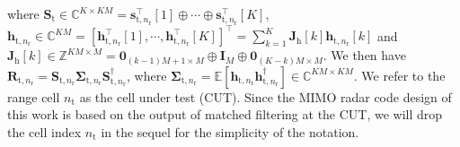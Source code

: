 \documentclass[10pt,journal]{IEEEtran}
\newcommand{\paren}[1]{\left({#1}\right)}
\newcommand{\bracket}[1]{{\left [{#1}\right ]}}
\newcommand{\rr}{_\mathrm{r}}
\newcommand{\target}{\mathrm{t}}
\theoremstyle{definition}
\begin{document}
	where  $\mathbf{S}_{\mathrm{t}}\in\mathbb{C}^{K\times KM}=\mathbf{s}^\top_{\target,n\rr}\bracket{1}\oplus\cdots\oplus\mathbf{s}^\top_{\target,n\rr}\bracket{K}$, $\mathbf{h}_{\mathrm{t},n\rr}\in\mathbb{C}^{KM}=\bracket{\mathbf{h}^\top_{\target,n\rr}\bracket{1},\cdots,\mathbf{h}^\top_{\target,n\rr}\bracket{K}}^\top=\sum_{k=1}^{K}\mathbf{J}_{\textrm{h}}\bracket{k}\mathbf{h}_{\target,n\rr}\bracket{k}$ and $\mathbf{J}_{\mathrm{h}}\bracket{k}\in\mathbb{Z}^{KM\times M}=\mathbf{0}_{\paren{k-1}M+1\times M}\oplus\mathbf{I}_{M}\oplus\mathbf{0}_{\paren{K-k}M\times M}$. We then have $\mathbf{R}_{\target,n\rr}=\mathbf{S}_{\target,n\rr}\boldsymbol{\Sigma}_{\target,n\rr}\mathbf{S}^\dagger_{\target,n\rr}$, where $\boldsymbol{\Sigma}_{\target,n\rr}=\mathbb{E}\bracket{\mathbf{h}_{\target,n\rr}\mathbf{h}^\dagger_{\target,n\rr}}\in\mathbb{C}^{KM\times KM}$.
	We refer to the range cell $n_\target$ as the cell under test (CUT). Since the MIMO radar code design of this work is based on the output of matched filtering at the CUT, we will drop the cell index $n_\target$ in the sequel for the simplicity of the notation.
	
\end{document}
